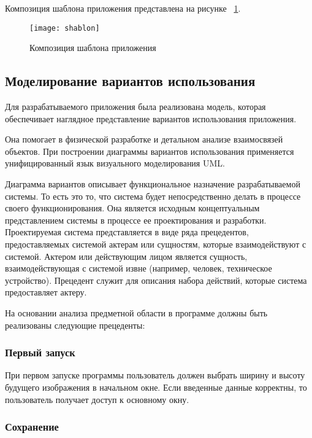 Композиция шаблона приложения представлена на рисунке ~\ref{shablon:image}.

\begin{figure}[ht]
\texttt{[image: shablon]}
\caption{Композиция шаблона приложения}
\label{shablon:image}
\end{figure}

\subsection{Моделирование вариантов использования}

Для разрабатываемого приложения была реализована модель, которая обеспечивает наглядное представление вариантов использования приложения.

Она помогает в физической разработке и детальном анализе взаимосвязей объектов. При построении диаграммы вариантов использования применяется унифицированный язык визуального моделирования UML.

Диаграмма вариантов описывает функциональное назначение разрабатываемой системы. То есть это то, что система будет непосредственно делать в процессе своего функционирования. Она является исходным концептуальным представлением системы в процессе ее проектирования и разработки. Проектируемая система представляется в виде ряда прецедентов, предоставляемых системой актерам или сущностям, которые взаимодействуют с системой. Актером или действующим лицом является сущность, взаимодействующая с системой извне (например, человек, техническое устройство). Прецедент служит для описания набора действий, которые система предоставляет актеру.

На основании анализа предметной области в программе должны быть реализованы следующие прецеденты:
\subsubsection{Первый запуск}

При первом запуске программы пользователь должен выбрать ширину и высоту будущего изображения в начальном окне. Если введенные данные корректны, то пользователь получает доступ к основному окну.

\subsubsection{Сохранение}

